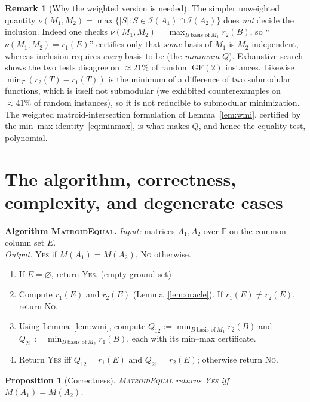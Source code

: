 \documentclass{amsart}
\theoremstyle{plain}
\newtheorem{proposition}{Proposition}
\theoremstyle{definition}
\newtheorem{remark}{Remark}
\newcommand{\I}{\mathcal{I}}
\newcommand{\F}{\mathbb{F}}
\begin{document}
\begin{remark}[Why the weighted version is needed]\label{rem:weighted}
The simpler unweighted quantity $\nu(M_1,M_2)=\max\{|S|:S\in\I(A_1)\cap\I(A_2)\}$ does \emph{not}
decide the inclusion. Indeed one checks $\nu(M_1,M_2)=\max_{B\ \text{basis of}\ M_1}r_2(B)$, so
``$\nu(M_1,M_2)=r_1(E)$'' certifies only that \emph{some} basis of $M_1$ is $M_2$-independent,
whereas inclusion requires \emph{every} basis to be (the \emph{minimum} $Q$). Exhaustive search
shows the two tests disagree on $\approx21\%$ of random $\mathrm{GF}(2)$ instances. Likewise
$\min_T(r_2(T)-r_1(T))$ is the minimum of a difference of two submodular functions, which is
itself not submodular (we exhibited counterexamples on $\approx41\%$ of random instances), so it
is not reducible to submodular minimization. The weighted matroid-intersection formulation of
Lemma~\ref{lem:wmi}, certified by the min--max identity~\eqref{eq:minmax}, is what makes $Q$, and
hence the equality test, polynomial.
\end{remark}

\section{The algorithm, correctness, complexity, and degenerate cases}\label{sec:algorithm}

\noindent\textbf{Algorithm \textsc{MatroidEqual}.}\quad
\emph{Input:} matrices $A_1,A_2$ over $\F$ on the common column set $E$.\\
\emph{Output:} \textsc{Yes} if $M(A_1)=M(A_2)$, \textsc{No} otherwise.
\begin{enumerate}
\item If $E=\varnothing$, return \textsc{Yes}. \hfill(empty ground set)
\item Compute $r_1(E)$ and $r_2(E)$ (Lemma~\ref{lem:oracle}). If $r_1(E)\ne r_2(E)$, return
\textsc{No}.
\item Using Lemma~\ref{lem:wmi}, compute $Q_{12}:=\min_{B\ \text{basis of}\ M_1}r_2(B)$ and
$Q_{21}:=\min_{B\ \text{basis of}\ M_2}r_1(B)$, each with its min--max certificate.
\item Return \textsc{Yes} iff $Q_{12}=r_1(E)$ and $Q_{21}=r_2(E)$; otherwise return \textsc{No}.
\end{enumerate}

\begin{proposition}[Correctness]\label{prop:correct}
\textsc{MatroidEqual} returns \textsc{Yes} iff $M(A_1)=M(A_2)$.
\end{proposition}
\end{document}
